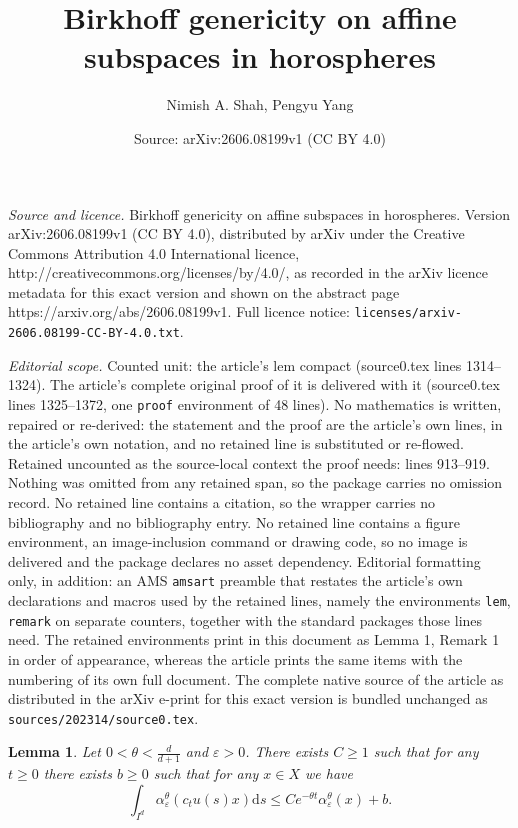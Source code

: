 \documentclass[10pt,a4paper]{amsart}
\title{Birkhoff genericity on affine subspaces in horospheres}
\author{Nimish A. Shah, Pengyu Yang}
\date{Source: arXiv:2606.08199v1 (CC BY 4.0)}
\newtheorem{lem}{Lemma}
\newcommand{\de}{\mathrm{d}}
\newcommand{\eps}{\varepsilon}
\begin{document}
\maketitle

\noindent\emph{Source and licence.} Birkhoff genericity on affine subspaces in horospheres. Version arXiv:2606.08199v1 (CC BY 4.0), distributed by arXiv under the Creative Commons Attribution 4.0 International licence, http://creativecommons.org/licenses/by/4.0/, as recorded in the arXiv licence metadata for this exact version and shown on the abstract page https://arxiv.org/abs/2606.08199v1. Full licence notice: \texttt{licenses/arxiv-2606.08199-CC-BY-4.0.txt}.\par\smallskip

\noindent\textit{Editorial scope.} Counted unit: the article's lem compact (source0.tex lines 1314--1324). The article's complete original proof of it is delivered with it (source0.tex lines 1325--1372, one \texttt{proof} environment of 48 lines). No mathematics is written, repaired or re-derived: the statement and the proof are the article's own lines, in the article's own notation, and no retained line is substituted or re-flowed.  Retained uncounted as the source-local context the proof needs: lines 913--919.  Nothing was omitted from any retained span, so the package carries no omission record.  No retained line contains a citation, so the wrapper carries no bibliography and no bibliography entry.  No retained line contains a figure environment, an image-inclusion command or drawing code, so no image is delivered and the package declares no asset dependency.  Editorial formatting only, in addition: an AMS \texttt{amsart} preamble that restates the article's own declarations and macros used by the retained lines, namely the environments \texttt{lem}, \texttt{remark} on separate counters, together with the standard packages those lines need.  The retained environments print in this document as Lemma 1, Remark 1 in order of appearance, whereas the article prints the same items with the numbering of its own full document.  The complete native source of the article as distributed in the arXiv e-print for this exact version is bundled unchanged as \texttt{sources/202314/source0.tex}.
	\begin{lem}\label{lem:contraction_alpha}
		Let $0<\theta<\frac{d}{d+1}$ and $\eps>0$. There exists $C\geq 1$ such that for any $t\geq0$ there exists $b\geq 0$ such that for any $x\in X$ we have
		\begin{equation}\label{eq:contraction hypothesis alphaEpsTheta}
		\int_{I^d}\alpha_\eps^{\theta}(c_tu(s)x)\de s\leq
		Ce^{-\theta t}\alpha_\eps^{\theta}(x)+b.
		\end{equation}
	\end{lem}
\end{document}
